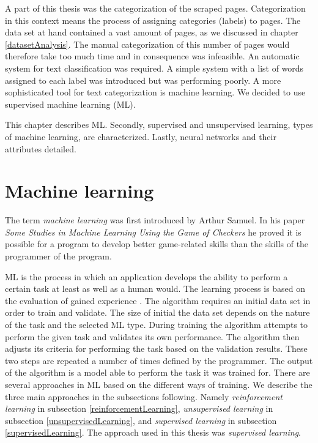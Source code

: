 \label{machineLearning}
A part of this thesis was the categorization of the scraped pages. Categorization in this context means the process of assigning categories (labels) to pages. The data set at hand contained a vast amount of pages, as we discussed in chapter \ref{datasetAnalysis}. The manual categorization of this number of pages would therefore take too much time and in consequence was infeasible. An automatic system for text classification was required. A simple system with a list of words assigned to each label was introduced but was performing poorly. A more sophisticated tool for text categorization is machine learning. We decided to use supervised machine learning (ML).

This chapter describes ML. Secondly, supervised and unsupervised learning, types of machine learning, are characterized. Lastly, neural networks and their attributes detailed.
 
\section{Machine learning} \label{machineLearning}
The term \textit{machine learning} was first introduced by Arthur Samuel. In his paper \textit{Some Studies in Machine Learning Using the Game of Checkers} \cite{machineLearningOriginal} he proved it is possible for a program to develop better game-related skills than the skills of the programmer of the program.

ML is the process in which an application develops the ability to perform a certain task at least as well as a human would. The learning process is based on the evaluation of gained experience \cite{machineLearningToday}. The algorithm requires an initial data set in order to train and validate. The size of initial the data set depends on the nature of the task and the selected ML type. During training the algorithm attempts to perform the given task and validates its own performance. The algorithm then adjusts its criteria for performing the task based on the validation results. These two steps are repeated a number of times defined by the programmer. The output of the algorithm is a model able to perform the task it was trained for. There are several approaches in ML based on the different ways of training. We describe the three main approaches in the subsections following. Namely \textit{reinforcement learning} in subsection \ref{reinforcementLearning}, \textit{unsupervised learning} in subsection \ref{unsupervisedLearning}, and \textit{supervised learning} in subsection \ref{supervisedLearning}. The approach used in this thesis was \textit{supervised learning}. 

